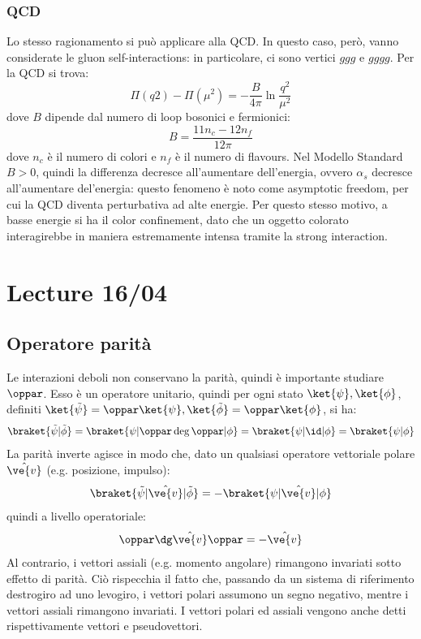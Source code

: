 \subsection{QCD}

Lo stesso ragionamento si può applicare alla QCD. In questo caso, però, vanno considerate le gluon self-interactions: in particolare, ci sono vertici $ ggg $ e $ gggg $. Per la QCD si trova:
\begin{equation*}
  \Pi(q2) - \Pi(\mu^2) = - \frac{B}{4\pi} \ln \frac{q^2}{\mu^2}
\end{equation*}
dove $ B $ dipende dal numero di loop bosonici e fermionici:
\begin{equation*}
  B = \frac{11 n_c - 12 n_f}{12 \pi}
\end{equation*}
dove $ n_c $ è il numero di colori e $ n_f $ è il numero di flavours. Nel Modello Standard $ B > 0 $, quindi la differenza decresce all'aumentare dell'energia, ovvero $ \alpha_s $ decresce all'aumentare del'energia: questo fenomeno è noto come asymptotic freedom, per cui la QCD diventa perturbativa ad alte energie. Per questo stesso motivo, a basse energie si ha il color confinement, dato che un oggetto colorato interagirebbe in maniera estremamente intensa tramite la strong interaction.

\chapter{Lecture 16/04}

\section{Operatore parità}

Le interazioni deboli non conservano la parità, quindi è importante studiare $ \oppar $. Esso è un operatore unitario, quindi per ogni stato $ \ket{\psi} , \ket{\phi} $, definiti $ \ket{\tilde{\psi}} = \oppar \ket{\psi} , \ket{\tilde{\phi}} = \oppar \ket{\phi} $, si ha:
\begin{equation*}
  \braket{\tilde{\psi} | \tilde{\phi}} = \braket{\psi | \oppar\deg \oppar | \phi} = \braket{\psi | \id | \phi} = \braket{\psi | \phi}
\end{equation*}
La parità inverte agisce in modo che, dato un qualsiasi operatore vettoriale polare $ \hat{\ve{v}} $ (e.g. posizione, impulso):
\begin{equation*}
  \braket{\tilde{\psi} | \hat{\ve{v}} | \tilde{\phi}} = - \braket{\psi | \hat{\ve{v}} | \phi}
\end{equation*}
quindi a livello operatoriale:
\begin{equation}
  \oppar\dg \hat{\ve{v}} \oppar = - \hat{\ve{v}}
\end{equation}
Al contrario, i vettori assiali (e.g. momento angolare) rimangono invariati sotto effetto di parità. Ciò rispecchia il fatto che, passando da un sistema di riferimento destrogiro ad uno levogiro, i vettori polari assumono un segno negativo, mentre i vettori assiali rimangono invariati. I vettori polari ed assiali vengono anche detti rispettivamente vettori e pseudovettori.


